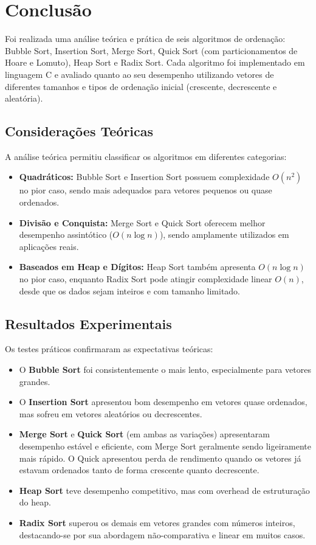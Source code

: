 \section{Conclusão}

Foi realizada uma análise teórica e prática de seis algoritmos de ordenação: Bubble Sort, Insertion Sort, Merge Sort, Quick Sort (com particionamentos de Hoare e Lomuto), Heap Sort e Radix Sort. Cada algoritmo foi implementado em linguagem C e avaliado quanto ao seu desempenho utilizando vetores de diferentes tamanhos e tipos de ordenação inicial (crescente, decrescente e aleatória).

\subsection*{Considerações Teóricas}

A análise teórica permitiu classificar os algoritmos em diferentes categorias:

\begin{itemize}
    \item \textbf{Quadráticos:} Bubble Sort e Insertion Sort possuem complexidade \(O(n^2)\) no pior caso, sendo mais adequados para vetores pequenos ou quase ordenados.
    \item \textbf{Divisão e Conquista:} Merge Sort e Quick Sort oferecem melhor desempenho assintótico (\(O(n \log n)\)), sendo amplamente utilizados em aplicações reais.
    \item \textbf{Baseados em Heap e Dígitos:} Heap Sort também apresenta \(O(n \log n)\) no pior caso, enquanto Radix Sort pode atingir complexidade linear \(O(n)\), desde que os dados sejam inteiros e com tamanho limitado.
\end{itemize}

\subsection*{Resultados Experimentais}

Os testes práticos confirmaram as expectativas teóricas:

\begin{itemize}
    \item O \textbf{Bubble Sort} foi consistentemente o mais lento, especialmente para vetores grandes.
    \item O \textbf{Insertion Sort} apresentou bom desempenho em vetores quase ordenados, mas sofreu em vetores aleatórios ou decrescentes.
    \item \textbf{Merge Sort} e \textbf{Quick Sort} (em ambas as variações) apresentaram desempenho estável e eficiente, com Merge Sort geralmente sendo ligeiramente mais rápido. O Quick apresentou perda de rendimento quando os vetores já estavam ordenados tanto de forma crescente quanto decrescente.
    \item \textbf{Heap Sort} teve desempenho competitivo, mas com overhead de estruturação do heap.
    \item \textbf{Radix Sort} superou os demais em vetores grandes com números inteiros, destacando-se por sua abordagem não-comparativa e linear em muitos casos.
\end{itemize}

